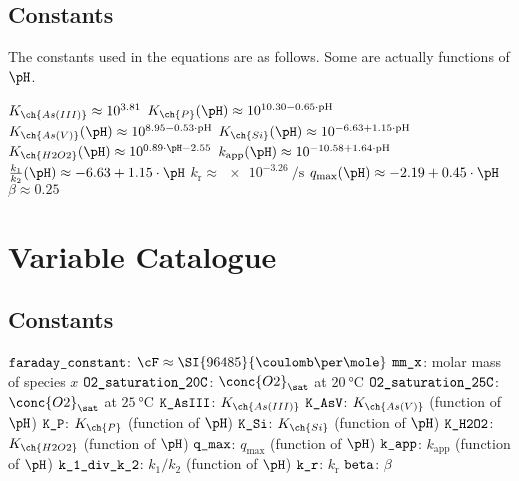 \documentclass[11pt]{scrartcl} %
\begin{document}
    \subsection{Constants}

    The constants used in the equations are as follows. Some are actually functions of $\pH$.
    \begin{multicols}{2}
        \begin{itemize}
            \ii $K_{\ch{As (III)}} \approx 10^{3.81}$
            \ii $K_{\ch{P}}(\pH) \approx 10^{10.30 -0.65 \cdot \mathrm{pH}}$
            \ii $K_{\ch{As (V)}}(\pH) \approx 10^{8.95 -0.53 \cdot \mathrm{pH}}$
            \ii $K_{\ch{Si}}(\pH) \approx 10^{-6.63 + 1.15\cdot \mathrm{pH}}$
            \ii $K_{\ch{H2O2}}(\pH) \approx 10^{0.89\cdot \pH - 2.55}$
            \columnbreak
            \ii $k_{\mathrm{app}}(\pH) \approx 10^{-10.58 + 1.64\cdot \mathrm{pH}}$
            \ii $\frac{k_1}{k_2}(\pH) \approx -6.63 + 1.15\cdot \pH$
            \ii $k_{\mathrm{r}} \approx \SI{e-3.26}{\per\second}$
            \ii $q_{\max}(\pH) \approx -2.19 + 0.45 \cdot \pH$
            \ii $\beta \approx 0.25$
    \end{itemize}
\end{multicols}

\section{Variable Catalogue}

\subsection{Constants}
\begin{multicols}{3}
    \begin{itemize}
        \ii $\verb|faraday_constant|$: $\cF \approx \SI{96485}{\coulomb\per\mole}$
        \ii $\verb|mm_x|$: molar mass of species $x$
        \ii $\verb|O2_saturation_20C|$: $\conc{O2}_\sat$ at $\SI{20}{\celsius}$
        \ii $\verb|O2_saturation_25C|$: $\conc{O2}_\sat$ at $\SI{25}{\celsius}$
        \ii $\verb|K_AsIII|$: $K_{\ch{As (III)}}$
        \ii $\verb|K_AsV|$: $K_{\ch{As(V)}}$ (function of $\pH$)
        \ii $\verb|K_P|$: $K_{\ch{P}}$ (function of $\pH$)
        \ii $\verb|K_Si|$: $K_{\ch{Si}}$ (function of $\pH$)
        \ii $\verb|K_H2O2|$: $K_{\ch{H2O2}}$ (function of $\pH$)
        \ii $\verb|q_max|$: $q_{\max}$ (function of $\pH$)
        \ii $\verb|k_app|$: $k_{\mathrm{app}}$ (function of $\pH$)
        \ii $\verb|k_1_div_k_2|$: $k_1/k_2$ (function of $\pH$)
        \ii $\verb|k_r|$: $k_{\mathrm{r}}$
        \ii $\verb|beta|$: $\beta$
\end{itemize}
        \end{multicols}
\end{document}
